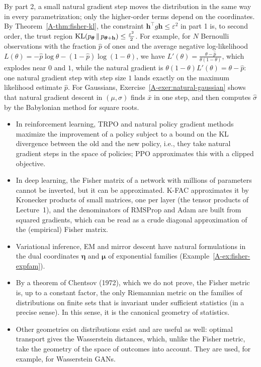 By part 2, a small natural gradient step moves the distribution in the same way in every parametrization; only the higher-order terms depend on the coordinates. By Theorem~\ref{A-thm:fisher-kl}, the constraint $\mathbf{h}^\top g\mathbf{h} \leq \varepsilon^2$ in part 1 is, to second order, the trust region $\operatorname{KL}(p_{\boldsymbol{\theta}} \,\|\, p_{\boldsymbol{\theta} + \mathbf{h}}) \leq \frac{\varepsilon^2}{2}$. For example, for $N$ Bernoulli observations with the fraction $\hat p$ of ones and the average negative log-likelihood $L(\theta) = -\hat p\log\theta - (1 - \hat p)\log(1 - \theta)$, we have $L'(\theta) = \frac{\theta - \hat p}{\theta(1 - \theta)}$, which explodes near $0$ and $1$, while the natural gradient is $\theta(1 - \theta)L'(\theta) = \theta - \hat p$: one natural gradient step with step size $1$ lands exactly on the maximum likelihood estimate $\hat p$. For Gaussians, Exercise~\ref{A-exer:natural-gaussian} shows that natural gradient descent in $(\mu, \sigma)$ finds $\bar x$ in one step, and then computes $\hat\sigma$ by the Babylonian method for square roots.

\begin{remark}
    \begin{itemize}
        \item In reinforcement learning, TRPO and natural policy gradient methods maximize the improvement of a policy subject to a bound on the KL divergence between the old and the new policy, i.e., they take natural gradient steps in the space of policies; PPO approximates this with a clipped objective.
        \item In deep learning, the Fisher matrix of a network with millions of parameters cannot be inverted, but it can be approximated. K-FAC approximates it by Kronecker products of small matrices, one per layer (the tensor products of Lecture~1), and the denominators of RMSProp and Adam are built from squared gradients, which can be read as a crude diagonal approximation of the (empirical) Fisher matrix.
        \item Variational inference, EM and mirror descent have natural formulations in the dual coordinates $\boldsymbol{\eta}$ and $\boldsymbol{\mu}$ of exponential families (Example~\ref{A-ex:fisher-expfam}).
        \item By a theorem of Chentsov (1972), which we do not prove, the Fisher metric is, up to a constant factor, the only Riemannian metric on the families of distributions on finite sets that is invariant under sufficient statistics (in a precise sense). In this sense, it is the canonical geometry of statistics.
        \item Other geometries on distributions exist and are useful as well: optimal transport gives the Wasserstein distances, which, unlike the Fisher metric, take the geometry of the space of outcomes into account. They are used, for example, for Wasserstein GANs.
    \end{itemize}
\end{remark}

